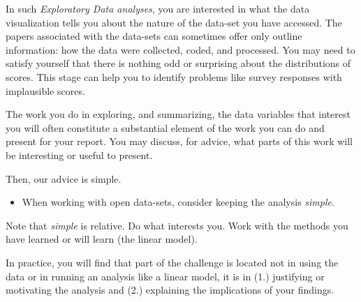 \documentclass[
  letterpaper,
  DIV=11,
  numbers=noendperiod]{scrreprt}
\providecommand{\tightlist}{%
  \setlength{\itemsep}{0pt}\setlength{\parskip}{0pt}}\usepackage{longtable,booktabs,array}
\begin{document}
In such \emph{Exploratory Data analyses}, you are interested in what the
data visualization tells you about the nature of the data-set you have
accessed. The papers associated with the data-sets can sometimes offer
only outline information: how the data were collected, coded, and
processed. You may need to satisfy yourself that there is nothing odd or
surprising about the distributions of scores. This stage can help you to
identify problems like survey responses with implausible scores.

The work you do in exploring, and summarizing, the data variables that
interest you will often constitute a substantial element of the work you
can do and present for your report. You may discuss, for advice, what
parts of this work will be interesting or useful to present.

Then, our advice is simple.

\begin{tcolorbox}[enhanced jigsaw, opacitybacktitle=0.6, title=\textcolor{quarto-callout-tip-color}{\faLightbulb}\hspace{0.5em}{Tip}, arc=.35mm, colbacktitle=quarto-callout-tip-color!10!white, colframe=quarto-callout-tip-color-frame, leftrule=.75mm, opacityback=0, breakable, titlerule=0mm, left=2mm, bottomrule=.15mm, toprule=.15mm, colback=white, coltitle=black, bottomtitle=1mm, toptitle=1mm, rightrule=.15mm]

\begin{itemize}
\tightlist
\item
  When working with open data-sets, consider keeping the analysis
  \emph{simple}.
\end{itemize}

\end{tcolorbox}

Note that \emph{simple} is relative. Do what interests you. Work with
the methods you have learned or will learn (the linear model).

In practice, you will find that part of the challenge is located not in
using the data or in running an analysis like a linear model, it is in
(1.) justifying or motivating the analysis and (2.) explaining the
implications of your findings.
\end{document}
